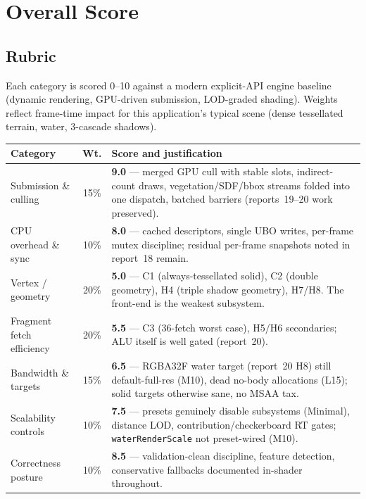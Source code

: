 \documentclass[11pt,a4paper]{article}
\begin{document}
\section{Overall Score}
\label{sec:score}

\subsection{Rubric}

Each category is scored 0--10 against a modern explicit-API engine baseline
(dynamic rendering, GPU-driven submission, LOD-graded shading). Weights
reflect frame-time impact for this application's typical scene (dense
tessellated terrain, water, 3-cascade shadows).

\begin{table}[h]
\centering
\small
\begin{tabular}{@{}lcp{7.2cm}@{}}
\toprule
\textbf{Category} & \textbf{Wt.} & \textbf{Score and justification} \\
\midrule
Submission \& culling & 15\% & \textbf{9.0} --- merged GPU cull with stable
slots, indirect-count draws, vegetation/SDF/bbox streams folded into one
dispatch, batched barriers (reports~19--20 work preserved). \\
CPU overhead \& sync & 10\% & \textbf{8.0} --- cached descriptors, single UBO
writes, per-frame mutex discipline; residual per-frame snapshots noted in
report~18 remain. \\
Vertex / geometry & 20\% & \textbf{5.0} --- C1 (always-tessellated solid),
C2 (double geometry), H4 (triple shadow geometry), H7/H8. The front-end is
the weakest subsystem. \\
Fragment fetch efficiency & 20\% & \textbf{5.5} --- C3 (36-fetch worst case),
H5/H6 secondaries; ALU itself is well gated (report~20). \\
Bandwidth \& targets & 15\% & \textbf{6.5} --- RGBA32F water target (report~20
H8) still default-full-res (M10), dead no-body allocations (L15); solid
targets otherwise sane, no MSAA tax. \\
Scalability controls & 10\% & \textbf{7.5} --- presets genuinely disable
subsystems (Minimal), distance LOD, contribution/checkerboard RT gates;
\texttt{waterRenderScale} not preset-wired (M10). \\
Correctness posture & 10\% & \textbf{8.5} --- validation-clean discipline,
feature detection, conservative fallbacks documented in-shader throughout. \\
\bottomrule
\end{tabular}
\end{table}
\end{document}
